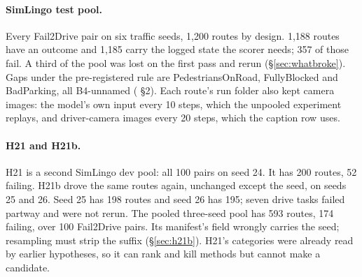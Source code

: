 \paragraph{SimLingo test pool.}
Every Fail2Drive pair on six traffic seeds, 1,200 routes by design.
1,188 routes have an outcome and 1,185 carry the logged state the scorer needs;
357 of those fail. A third of the pool was lost on the first pass and rerun
(\S\ref{sec:whatbroke}).
Gaps under the pre-registered rule are
PedestriansOnRoad, FullyBlocked and BadParking, all B4-unnamed
( \S2). Each route's run folder also kept camera
images: the model's own input every 10 steps, which the unpooled experiment
replays, and driver-camera images every 20 steps, which the caption row uses.

\paragraph{H21 and H21b.}
H21 is a second SimLingo dev pool: all 100 pairs on seed 24.
It has 200 routes, 52 failing. H21b drove the same routes again, unchanged
except the seed, on seeds 25 and 26.
Seed 25 has 198 routes and seed 26 has 195; seven drive tasks failed partway and
were not rerun.
The pooled three-seed pool has 593 routes, 174 failing, over 100 Fail2Drive
pairs. Its manifest's  field wrongly carries the seed; resampling must
strip the suffix (\S\ref{sec:h21b}). H21's categories were already read by
earlier hypotheses, so it can rank and kill methods but cannot make a candidate.

